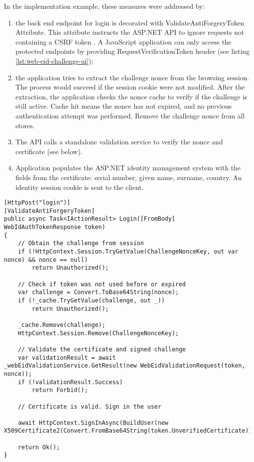 In the implementation example, these measures were addressed by:
\begin{enumerate}
  \item the back end endpoint for login is decorated with ValidateAntiForgeryToken Attribute. This attribute instructs the ASP.NET API to ignore requests not containing a CSRF token \cite{msdocs-anti-request-forgery}. A JavaScript application can only access the protected endpoints by providing RequestVerificationToken header (see listing \ref{lst:web-eid-challenge-ui});
  \item the application tries to extract the challenge nonce from the browsing session. The process would succeed if the session cookie were not modified. After the extraction, the application checks the nonce cache to verify if the challenge is still active. Cache hit means the nonce has not expired, and no previous authentication attempt was performed. Remove the challenge nonce from all stores.
  \item The API calls a standalone validation service to verify the nonce and certificate (see below).
  \item Application populates the ASP.NET identity management system with the fields from the certificate: serial number, given name, surname, country. An identity session cookie is sent to the client.
\end{enumerate}

\begin{lstlisting}[caption={Web eID Login Endpoint}, label={lst:web-eid-login}]
[HttpPost("login")]
[ValidateAntiForgeryToken]
public async Task<IActionResult> Login([FromBody] WebIdAuthTokenResponse token)
{
    // Obtain the challenge from session
    if (!HttpContext.Session.TryGetValue(ChallengeNonceKey, out var nonce) && nonce == null)
        return Unauthorized();

    // Check if token was not used before or expired
    var challenge = Convert.ToBase64String(nonce);
    if (!_cache.TryGetValue(challenge, out _))
        return Unauthorized();

    _cache.Remove(challenge);
    HttpContext.Session.Remove(ChallengeNonceKey);

    // Validate the certificate and signed challenge
    var validationResult = await _webEidValidationService.GetResult(new WebEidValidationRequest(token, nonce));
    if (!validationResult.Success)
        return Forbid();

    // Certificate is valid. Sign in the user

    await HttpContext.SignInAsync(BuildUser(new X509Certificate2(Convert.FromBase64String(token.UnverifiedCertificate)).Subject));

    return Ok();
}
\end{lstlisting}

